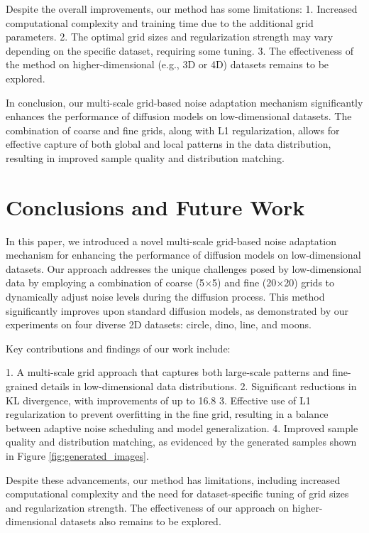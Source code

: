 \documentclass{article} %
\begin{document}
Despite the overall improvements, our method has some limitations:
1. Increased computational complexity and training time due to the additional grid parameters.
2. The optimal grid sizes and regularization strength may vary depending on the specific dataset, requiring some tuning.
3. The effectiveness of the method on higher-dimensional (e.g., 3D or 4D) datasets remains to be explored.

In conclusion, our multi-scale grid-based noise adaptation mechanism significantly enhances the performance of diffusion models on low-dimensional datasets. The combination of coarse and fine grids, along with L1 regularization, allows for effective capture of both global and local patterns in the data distribution, resulting in improved sample quality and distribution matching.

\section{Conclusions and Future Work}
\label{sec:conclusion}

In this paper, we introduced a novel multi-scale grid-based noise adaptation mechanism for enhancing the performance of diffusion models on low-dimensional datasets. Our approach addresses the unique challenges posed by low-dimensional data by employing a combination of coarse (5$\times$5) and fine (20$\times$20) grids to dynamically adjust noise levels during the diffusion process. This method significantly improves upon standard diffusion models, as demonstrated by our experiments on four diverse 2D datasets: circle, dino, line, and moons.

Key contributions and findings of our work include:

1. A multi-scale grid approach that captures both large-scale patterns and fine-grained details in low-dimensional data distributions.
2. Significant reductions in KL divergence, with improvements of up to 16.8%
3. Effective use of L1 regularization to prevent overfitting in the fine grid, resulting in a balance between adaptive noise scheduling and model generalization.
4. Improved sample quality and distribution matching, as evidenced by the generated samples shown in Figure \ref{fig:generated_images}.

Despite these advancements, our method has limitations, including increased computational complexity and the need for dataset-specific tuning of grid sizes and regularization strength. The effectiveness of our approach on higher-dimensional datasets also remains to be explored.
\end{document}
